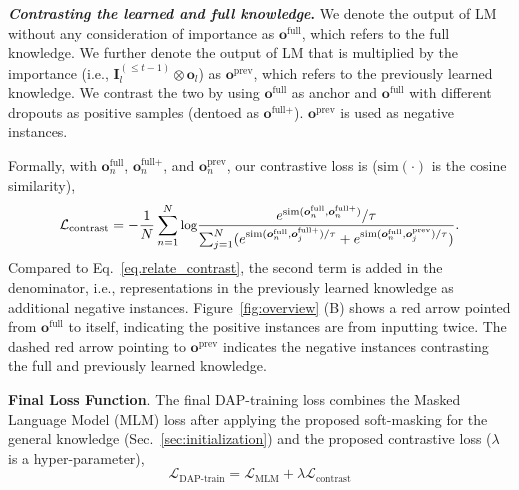 \documentclass{article} \usepackage{iclr2023_conference,times}
\begin{document}
{\color{black}\textbf{\textit{Contrasting the learned and full knowledge}.} We denote the output of LM without any consideration of importance as $\bm{o}^{\text{full}}$, which refers to the full knowledge. We further denote the output of LM that is multiplied by the importance (i.e., $\bm{I}^{(\le t-1)}_{l} \otimes \bm{o}_l$) as $\bm{o}^{\text{prev}}$, which refers to the previously learned knowledge. We contrast the two by using $\bm{o}^{\text{full}}$ as anchor and $\bm{o}^{\text{full}}$ with different dropouts as positive samples (dentoed as $\bm{o}^{\text{full+}}$).  $\bm{o}^{\text{prev}}$ is used as negative instances. 









Formally, with $\bm{o}_n^{\text{full}}$, $\bm{o}_n^{\text{full+}}$, and $\bm{o}_n^{\text{prev}}$, our contrastive loss is ($\text{sim}(\cdot)$ is the cosine similarity), {\color{black}\vspace{-1mm}
\begin{equation}
\label{eq:contrast}
\vspace{-1mm}
\small
\mathcal{L}_{\text{contrast}} =  -\frac{1}{N}\sum_{n=1}^{N}\text{log}\frac{e^{\text{sim}(\bm{o}_n^{\text{full}},\bm{o}_n^{\text{full+}})}/\tau}{\sum_{j=1}^{N}(e^{\text{sim}(\bm{o}_n^{\text{full}},\bm{o}_j^{\text{full+}})/\tau}+e^{\text{sim}(\bm{o}^{\text{full}}_n,\bm{o}_j^{\text{prev}})/\tau})}.
\end{equation}}
Compared to Eq.~\ref{eq.relate_contrast},
the second term is added in the denominator, i.e., representations in the previously learned knowledge as additional negative instances. Figure~\ref{fig:overview} (B) shows a red arrow pointed from $\bm{o}^{\text{full}}$ to itself, indicating the positive instances are from inputting twice. The dashed red arrow pointing to $\bm{o}^{\text{prev}}$ indicates the negative instances contrasting the full and previously learned knowledge.
}




\noindent
\textbf{Final Loss Function}.
The final DAP-training loss combines the Masked Language Model (MLM) loss after applying the proposed soft-masking for the general knowledge 
(Sec.~\ref{sec:initialization}) and the proposed contrastive loss ({\color{black}$\lambda$ is a hyper-parameter}),
\begin{equation}
\label{eq:final_loss}
\mathcal{L}_{\text{DAP-train}} = \mathcal{L}_{\text{MLM}} + \lambda\mathcal{L}_{\text{contrast}}
\end{equation}
\end{document}
